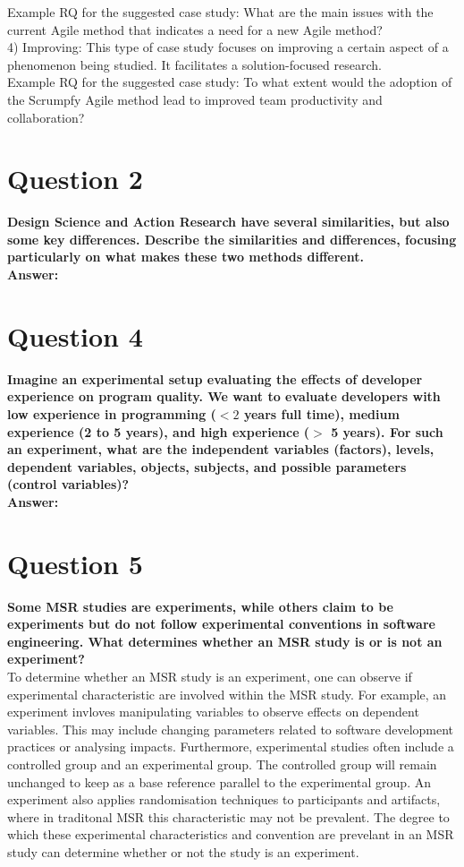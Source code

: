 \documentclass[conference]{IEEEtran}
\begin{document}
Example RQ for the suggested case study: What are the main issues with the current Agile method that indicates a need for a new Agile method?\\

4) Improving: This type of case study focuses on improving a certain aspect of a phenomenon being studied. It facilitates a solution-focused research.\\

Example RQ for the suggested case study: To what extent would the adoption of the Scrumpfy Agile method lead to improved team productivity and collaboration?

\section{Question 2}

\textbf{Design Science and Action Research have several similarities, but also some key differences. Describe the similarities and differences, focusing particularly on what makes these two methods different.}\\

\textbf{Answer:}

\section{Question 4}

\textbf{Imagine an experimental setup evaluating the effects of developer experience on program quality. We want to evaluate developers with low experience in programming ($<2$ years full time), medium experience (2 to 5 years), and high experience ($>$ 5 years). For such an experiment, what are the independent variables (factors), levels, dependent variables, objects, subjects, and possible parameters (control variables)?}\\

\textbf{Answer:}

\section{Question 5}

\textbf{Some MSR studies are experiments, while others claim to be experiments but do not follow experimental conventions in software engineering. What determines whether an MSR study is or is not an experiment?}\\
To determine whether an MSR study is an experiment, one can observe if experimental characteristic are involved within the MSR study. For example, an experiment invloves manipulating variables to observe effects on dependent variables. This may include changing parameters related to software development practices or analysing impacts. Furthermore, experimental studies often include a controlled group and an experimental group. The controlled group will remain unchanged to keep as a base reference parallel to the experimental group. An experiment also applies randomisation techniques to participants and artifacts, where in traditonal MSR this characteristic may not be prevalent. The degree to which these experimental characteristics and convention are prevelant in an MSR study can determine whether or not the study is an experiment.
\end{document}

